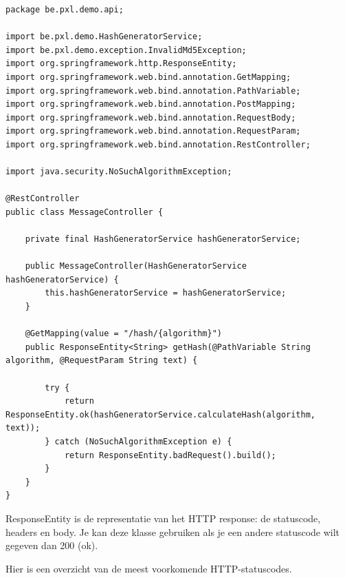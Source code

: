 \begin{lstlisting}
package be.pxl.demo.api;

import be.pxl.demo.HashGeneratorService;
import be.pxl.demo.exception.InvalidMd5Exception;
import org.springframework.http.ResponseEntity;
import org.springframework.web.bind.annotation.GetMapping;
import org.springframework.web.bind.annotation.PathVariable;
import org.springframework.web.bind.annotation.PostMapping;
import org.springframework.web.bind.annotation.RequestBody;
import org.springframework.web.bind.annotation.RequestParam;
import org.springframework.web.bind.annotation.RestController;

import java.security.NoSuchAlgorithmException;

@RestController
public class MessageController {

	private final HashGeneratorService hashGeneratorService;

	public MessageController(HashGeneratorService hashGeneratorService) {
		this.hashGeneratorService = hashGeneratorService;
	}

	@GetMapping(value = "/hash/{algorithm}")
	public ResponseEntity<String> getHash(@PathVariable String algorithm, @RequestParam String text) {

		try {
			return ResponseEntity.ok(hashGeneratorService.calculateHash(algorithm, text));
		} catch (NoSuchAlgorithmException e) {
			return ResponseEntity.badRequest().build();
		}
	}
}

\end{lstlisting}

ResponseEntity is de representatie van het HTTP response: de statuscode, headers en body.  Je kan deze klasse gebruiken als je een andere statuscode wilt gegeven dan 200 (ok).

Hier is een overzicht van de meest voorkomende HTTP-statuscodes.

